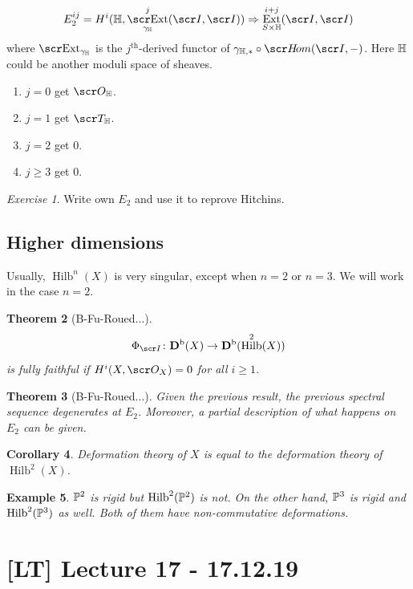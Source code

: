\documentclass[A4paper, british, reqno]{amsart}
\theoremstyle{darkgreentheorem}
\newtheorem{thm}{Theorem}[section]
\newtheorem{cor}[thm]{Corollary}
\theoremstyle{darkbluedefinition}
\theoremstyle{darkredexample}
\newtheorem{exa}[thm]{Example}
\theoremstyle{remark}
\newtheorem{exe}[thm]{Exercise}
\DeclareMathOperator{\Ext}{Ext}
\DeclareMathOperator{\ext}{\E xt}
\DeclareMathOperator{\Hilb}{Hilb}
\newcommand{\1}{\mathbbm{1}}
\begin{document}
\[ E_{2}^{ij}=H^{i}(\bbH,\ext_{\gamma_{\bbH}}^{j}(\I,\I))\Rightarrow \Ext_{S\times \bbH}^{i+j}(\I,\I) \]
where $\ext_{\gamma_{\bbH}}$ is the $j^{\mathrm{th}}$-derived functor of $\gamma_{\bbH,*}\circ \hom(\I,-)$.
Here $\bbH$ could be another moduli space of sheaves.
\begin{enumerate}
    \item $j=0$ get $\O_{\bbH}$.
    \item $j=1$ get $\sT_{\bbH}$.
    \item $j=2$ get $0$.
    \item $j\geqslant 3$ get $0$.
\end{enumerate}

\begin{exe}
    Write own $E_{2}$ and use it to reprove Hitchins.
\end{exe}

\subsection{Higher dimensions}

Usually, $\Hilb^{n}(X)$ is very singular, except when $n=2$ or $n=3$.
We will work in the case $n=2$.

\begin{thm}[B-Fu-Roued...]
    \[ \Phi_{\I}\colon \Db(X)\to \Db(\Hilb^{2}(X)) \]
    is fully faithful if $H^{i}(X,\O_{X})=0$ for all $i\geqslant 1$.
\end{thm}

\begin{thm}[B-Fu-Roued...]
    Given the previous result, the previous spectral sequence degenerates at $E_{2}$.
    Moreover, a partial description of what happens on $E_{2}$ can be given.
\end{thm}

\begin{cor}
    Deformation theory of $X$ is equal to the deformation theory of $\Hilb^{2}(X)$.
\end{cor}

\begin{exa}
    $\P^{2}$ is rigid but $\Hilb^{2}(\P^{2})$ is not.
    On the other hand, $\P^{3}$ is rigid and $\Hilb^{2}(\P^{3})$ as well.
    Both of them have non-commutative deformations.
\end{exa}

\section{[LT] Lecture 17 - 17.12.19}
\end{document}
